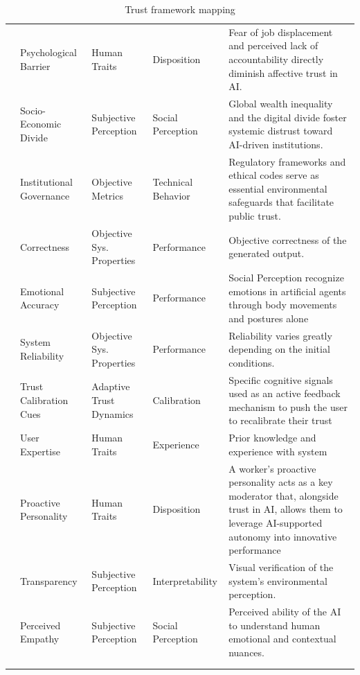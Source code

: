 \documentclass[sigconf]{acmart}
\begin{document}
\begin{longtable}{l l l l p{4cm}}
\cite{wang_2019_artificial_intelligence_future_humanity} & Psychological Barrier & Human Traits & Disposition & Fear of job displacement and perceived lack of accountability directly diminish affective trust in AI. \\
\cite{wang_2019_artificial_intelligence_future_humanity} & Socio-Economic Divide & Subjective Perception & Social Perception & Global wealth inequality and the digital divide foster systemic distrust toward AI-driven institutions. \\
\cite{wang_2019_artificial_intelligence_future_humanity} & Institutional Governance & Objective Metrics & Technical Behavior & Regulatory frameworks and ethical codes serve as essential environmental safeguards that facilitate public trust. \\
\cite{Chong_2022_Human} & Correctness & Objective Sys. Properties & Performance & Objective correctness of the generated output.\\
\cite{Hortensius_2018_emotions} & Emotional Accuracy & Subjective Perception & Performance & Social Perception recognize emotions in artificial agents through body movements  and postures alone \\
\cite{okamura_yamada_2020} & System Reliability & Objective Sys. Properties & Performance & Reliability varies greatly depending on the initial conditions. \\
\cite{okamura_yamada_2020} & Trust Calibration Cues & Adaptive Trust Dynamics & Calibration & Specific cognitive signals used as an active feedback mechanism to push the user to recalibrate their trust \\
\cite{zhang_et_al_2023} & User Expertise & Human Traits & Experience & Prior knowledge and experience with system \\
\cite{Haiyan_Kong_ZihanYin_KayeChon_YueYuan_JinhanYu_2023} & Proactive Personality & Human Traits & Disposition & A worker's proactive personality acts as a key moderator that, alongside trust in AI, allows them to leverage AI-supported autonomy into innovative performance \\
\cite{haeuslschmid_SupportingTrustAutonomousDriving} & Transparency & Subjective Perception & Interpretability & Visual verification of the system's environmental perception. \\
\cite{Tong_artificial_intelligence_feedback} & Perceived Empathy & Subjective Perception & Social Perception & Perceived ability of the AI to understand human emotional and contextual nuances. \\
\bottomrule
\caption{Trust framework mapping}\\
\label{tab:trust_framework}\\
\end{longtable}
\twocolumn
\end{document}
